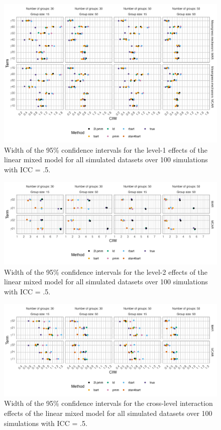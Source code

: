 \documentclass[3p,12pt,a4paper]{elsarticle}
\begin{document}
\begin{figure}[H]
    \centering
    \includegraphics[width=1\textwidth]{ciwlevel1.png}
    \caption{Width of the 95\% confidence intervals for the level-1 effects of the linear mixed model for all simulated datasets over 100 simulations with ICC = .5.}
    \label{fig:ciwlevel1}
\end{figure}

\begin{figure}[H]
    \centering
    \includegraphics[width=1\textwidth]{ciwlevel2.png}
    \caption{Width of the 95\% confidence intervals for the level-2 effects of the linear mixed model for all simulated datasets over 100 simulations with ICC = .5.}
    \label{fig:ciwlevel2}
\end{figure}

\begin{figure}[H]
    \centering
    \includegraphics[width=1\textwidth]{ciwcrosslevel.png}
    \caption{Width of the 95\% confidence intervals for the cross-level interaction effects of the linear mixed model for all simulated datasets over 100 simulations with ICC = .5.}
    \label{fig:ciwcrosslevel}
\end{figure}
\end{document}

